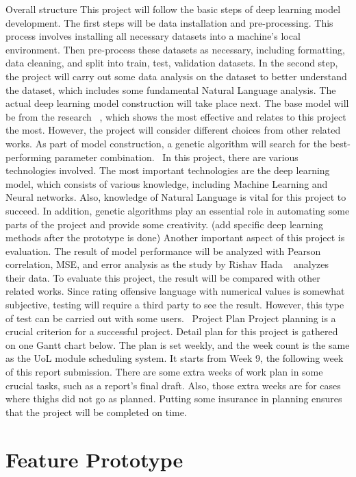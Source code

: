 \documentclass[12pt, natbib=false]{article}
\begin{document}
Overall structure
This project will follow the basic steps of deep learning model development. The first steps will be data installation and pre-processing. This process involves installing all necessary datasets into a machine’s local environment. Then pre-process these datasets as necessary, including formatting, data cleaning, and split into train, test, validation datasets. In the second step, the project will carry out some data analysis on the dataset to better understand the dataset, which includes some fundamental Natural Language analysis. The actual deep learning model construction will take place next. The base model will be from the research ~\cite{hada2021ruddit}, which shows the most effective and relates to this project the most. However, the project will consider different choices from other related works. As part of model construction, a genetic algorithm will search for the best-performing parameter combination. 
In this project, there are various technologies involved. The most important technologies are the deep learning model, which consists of various knowledge, including Machine Learning and Neural networks. Also, knowledge of Natural Language is vital for this project to succeed. In addition, genetic algorithms play an essential role in automating some parts of the project and provide some creativity. (add specific deep learning methods after the prototype is done)
Another important aspect of this project is evaluation. The result of model performance will be analyzed with Pearson correlation, MSE, and error analysis as the study by Rishav Hada ~\cite{hada2021ruddit} analyzes their data. To evaluate this project, the result will be compared with other related works. Since rating offensive language with numerical values is somewhat subjective, testing will require a third party to see the result. However, this type of test can be carried out with some users. 
Project Plan
Project planning is a crucial criterion for a successful project. Detail plan for this project is gathered on one Gantt chart below. The plan is set weekly, and the week count is the same as the UoL module scheduling system. It starts from Week 9, the following week of this report submission. There are some extra weeks of work plan in some crucial tasks, such as a report's final draft. Also, those extra weeks are for cases where thighs did not go as planned. Putting some insurance in planning ensures that the project will be completed on time. 


\section{Feature Prototype}
\end{document}
